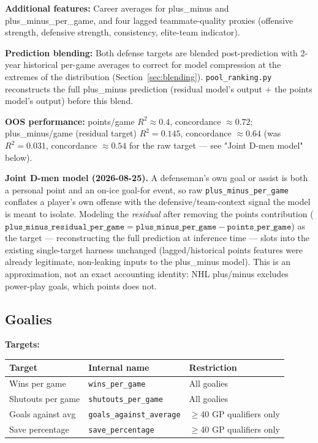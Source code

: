 \documentclass[11pt, a4paper]{article}
\begin{document}
\textbf{Additional features:} Career averages for plus\_minus and plus\_minus\_per\_game, and
four lagged teammate-quality proxies (offensive strength, defensive strength, consistency,
elite-team indicator).

\textbf{Prediction blending:} Both defense targets are blended post-prediction with 2-year
historical per-game averages to correct for model compression at the extremes of the
distribution (Section~\ref{sec:blending}). \texttt{pool\_ranking.py} reconstructs the full
plus\_minus prediction (residual model's output $+$ the points model's output) before this blend.

\textbf{OOS performance:} points/game $R^2 \approx 0.4$, concordance $\approx 0.72$;
plus\_minus/game (residual target) $R^2 = 0.145$, concordance $\approx 0.64$ (was $R^2=0.031$,
concordance $\approx 0.54$ for the raw target — see "Joint D-men model" below).

\textbf{Joint D-men model (2026-08-25).} A defenseman's own goal or assist is both a personal
point and an on-ice goal-for event, so raw \texttt{plus\_minus\_per\_game} conflates a player's
own offense with the defensive/team-context signal the model is meant to isolate. Modeling the
\emph{residual} after removing the points contribution
($\texttt{plus\_minus\_residual\_per\_game} = \texttt{plus\_minus\_per\_game} -
\texttt{points\_per\_game}$) as the target — reconstructing the full prediction at inference time
— slots into the existing single-target harness unchanged (lagged/historical points features
were already legitimate, non-leaking inputs to the plus\_minus model). This is an approximation,
not an exact accounting identity: NHL plus/minus excludes power-play goals, which points does
not.

\subsection{Goalies}
\label{sec:goalies}

\textbf{Targets:}

\begin{center}
\begin{tabular}{lll}
\toprule
Target & Internal name & Restriction \\
\midrule
Wins per game      & \texttt{wins\_per\_game}           & All goalies \\
Shutouts per game  & \texttt{shutouts\_per\_game}        & All goalies \\
Goals against avg  & \texttt{goals\_against\_average}    & $\geq$40 GP qualifiers only \\
Save percentage    & \texttt{save\_percentage}           & $\geq$40 GP qualifiers only \\
\bottomrule
\end{tabular}
\end{center}
\end{document}
